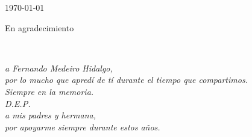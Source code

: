 \begin{titlepage}


{\large \today}\\[2cm] %



\vfill %

\end{titlepage}



\begin{minipage}{0.3\textwidth}
\begin{flushleft}
\vspace{4cm}
En agradecimiento

\end{flushleft}
\end{minipage}
~
\begin{minipage}{0.6\textwidth}
\begin{flushright}
\vspace{16cm}

\scriptsize
\emph{a Fernando Medeiro Hidalgo,}\\
\emph{por lo mucho que apredí de tí durante el tiempo que compartimos.}\\
\emph{Siempre en la memoria.}\\
\emph{D.E.P.}\\[1.5cm]

\emph{a mis padres y hermana,}\\
\emph{por apoyarme siempre durante estos años.}\\

\end{flushright}
\end{minipage}\\[2cm]
\vfill

\thispagestyle{empty}
